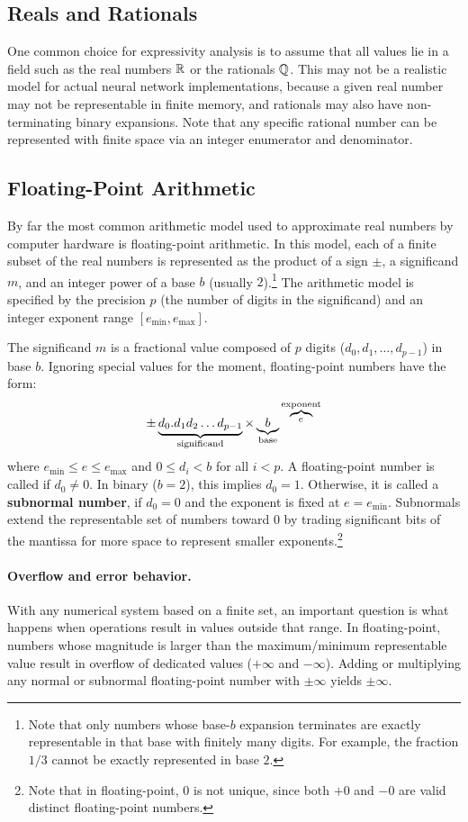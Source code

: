 \documentclass{article}
\begin{document}
\subsection{Reals and Rationals}
One common choice for expressivity analysis is to assume that all values lie in a field such as the real numbers $\mathbb{R}$ or the rationals $\mathbb{Q}$. This may not be a realistic model for actual neural network implementations, because a given real number may not be representable in finite memory, and rationals may also have non-terminating binary expansions. Note that any specific rational number can be represented with finite space via an integer enumerator and denominator.

\subsection{Floating-Point Arithmetic}

By far the most common arithmetic model used to approximate real numbers by computer hardware is floating-point arithmetic. In this model, each of a finite subset of the real numbers is represented as the product of a sign $\pm$, a significand $m$, and an integer power of a base $b$ (usually $2$).\footnote{Note that only numbers whose base-$b$ expansion terminates are exactly representable in that base with finitely many digits. For example, the fraction $1/3$ cannot be exactly represented in base $2$.} The arithmetic model is specified by the precision $p$ (the number of digits in the significand) and an integer exponent range $[e_{\min}, e_{\max}]$.

The significand $m$ is a fractional value composed of $p$ digits ($d_0, d_1, \dots, d_{p-1}$) in base $b$. Ignoring special values for the moment, floating-point numbers have the form:
$$
\pm \underbrace{d_0.d_1d_2\dots d_{p-1}}_{\text{significand}} \times \underbrace{b}_{\text{base}} \overbrace{\vphantom{b}^e}^{\text{exponent}}
$$
where $e_{\min} \le e \le e_{\max}$ and $0 \le d_i < b$ for all $i < p$. A floating-point number is called  if $d_0 \neq 0$. In binary ($b=2$), this implies $d_0 = 1$.
Otherwise, it is called a \textbf{subnormal number}, if $d_0=0$ and the exponent is fixed at $e = e_{\min}$. Subnormals extend the representable set of numbers toward $0$ by trading significant bits of the mantissa for more space to represent smaller exponents.\footnote{Note that in floating-point, 0 is not unique, since both $+0$ and $-0$ are valid distinct floating-point numbers.}

\paragraph{Overflow and error behavior.}
With any numerical system based on a finite set, an important question is what happens when operations result in values outside that range.
In floating-point, numbers whose magnitude is larger than the maximum/minimum representable value result in overflow of dedicated  values ($+\infty$ and $-\infty$). 
Adding or multiplying any normal or subnormal floating-point number with $\pm\infty$ yields $\pm\infty$.
\end{document}
